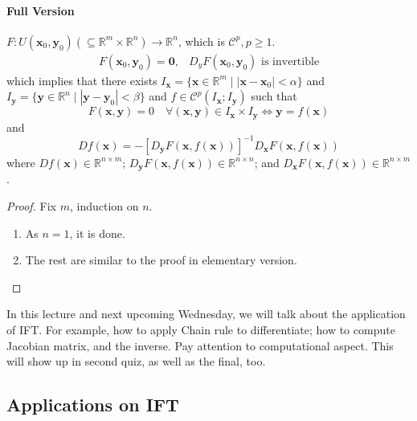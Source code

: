 \paragraph{Full Version}
$F: U(\bm x_0,\bm y_0)(\subseteq\mathbb{R}^m\times\mathbb{R}^n)\to\mathbb{R}^n$, which is $\mathcal{C}^p,p\ge1$.
\[
\begin{array}{ll}
F(\bm x_0,\bm y_0)=\bm 0,
&
D_yF(\bm x_0,\bm y_0)\mbox{ is invertible}
\end{array}
\]
which implies that there exists $I_{\bm x}=\{\bm x\in\mathbb{R}^m\mid |\bm x-\bm x_0|<\alpha\}$ and $I_{\bm y}=\{\bm y\in\mathbb{R}^n\mid |\bm y-\bm y_0|<\beta\}$ and $f\in\mathcal{C}^p(I_{\bm x};I_{\bm y})$ such that
\[
F(\bm x,\bm y)=0\quad\forall (\bm x,\bm y)\in I_{\bm x}\times I_{\bm y}\Longleftrightarrow
\bm y = f(\bm x)
\]
and
\[
Df(\bm x) = -[D_{\bm y}F(\bm x,f(\bm x))]^{-1}D_{\bm x}F(\bm x,f(\bm x))
\]
where $Df(\bm x)\in\mathbb{R}^{n\times m}$; $D_{\bm y}F(\bm x,f(\bm x))\in\mathbb{R}^{n\times n}$; and $D_{\bm x}F(\bm x,f(\bm x))\in\mathbb{R}^{n\times m}$.
\begin{proof}
Fix $m$, induction on $n$.
\begin{enumerate}
\item
As $n=1$, it is done.
\item
The rest are similar to the proof in elementary version.
\end{enumerate}
\end{proof}

In this lecture and next upcoming Wednesday, we will talk about the application of IFT. For example, how to apply Chain rule to differentiate; how to compute Jacobian matrix, and the inverse. Pay attention to computational aspect. This will show up in second quiz, as well as the final, too.

\subsection{Applications on IFT}

